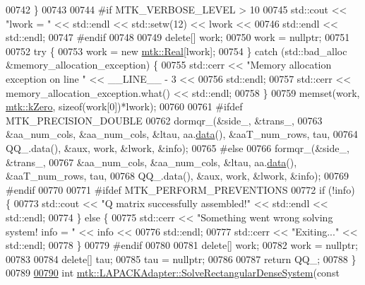 \begin{DoxyCode}
00742   \}
00743 
00744 \textcolor{preprocessor}{  #if MTK\_VERBOSE\_LEVEL > 10}
00745   std::cout << \textcolor{stringliteral}{"lwork = "} << std::endl << std::setw(12) << lwork <<
00746     std::endl << std::endl;
00747 \textcolor{preprocessor}{  #endif}
00748 
00749   \textcolor{keyword}{delete}[] work;
00750   work = \textcolor{keyword}{nullptr};
00751 
00752   \textcolor{keywordflow}{try} \{
00753     work = \textcolor{keyword}{new} \hyperlink{group__c01-roots_gac080bbbf5cbb5502c9f00405f894857d}{mtk::Real}[lwork];
00754   \} \textcolor{keywordflow}{catch} (std::bad\_alloc &memory\_allocation\_exception) \{
00755     std::cerr << \textcolor{stringliteral}{"Memory allocation exception on line "} << \_\_LINE\_\_ - 3 <<
00756       std::endl;
00757     std::cerr << memory\_allocation\_exception.what() << std::endl;
00758   \}
00759   memset(work, \hyperlink{group__c01-roots_ga59a451a5fae30d59649bcda274fea271}{mtk::kZero}, \textcolor{keyword}{sizeof}(work[0])*lwork);
00760 
00761 \textcolor{preprocessor}{  #ifdef MTK\_PRECISION\_DOUBLE}
00762   dormqr\_(&side\_, &trans\_,
00763           &aa\_num\_cols, &aa\_num\_cols, &ltau, aa.\hyperlink{classmtk_1_1DenseMatrix_a0c33b8a9e01d157c61ddbdf807c25d84}{data}(), &aaT\_num\_rows, tau,
00764           QQ\_.data(), &aux, work, &lwork, &info);
00765 \textcolor{preprocessor}{  #else}
00766   formqr\_(&side\_, &trans\_,
00767           &aa\_num\_cols, &aa\_num\_cols, &ltau, aa.\hyperlink{classmtk_1_1DenseMatrix_a0c33b8a9e01d157c61ddbdf807c25d84}{data}(), &aaT\_num\_rows, tau,
00768           QQ\_.data(), &aux, work, &lwork, &info);
00769 \textcolor{preprocessor}{  #endif}
00770 
00771 \textcolor{preprocessor}{  #ifdef MTK\_PERFORM\_PREVENTIONS}
00772   \textcolor{keywordflow}{if} (!info) \{
00773     std::cout << \textcolor{stringliteral}{"Q matrix successfully assembled!"} << std::endl << std::endl;
00774   \} \textcolor{keywordflow}{else} \{
00775     std::cerr << \textcolor{stringliteral}{"Something went wrong solving system! info = "} << info <<
00776       std::endl;
00777     std::cerr << \textcolor{stringliteral}{"Exiting..."} << std::endl;
00778   \}
00779 \textcolor{preprocessor}{  #endif}
00780 
00781   \textcolor{keyword}{delete}[] work;
00782   work = \textcolor{keyword}{nullptr};
00783 
00784   \textcolor{keyword}{delete}[] tau;
00785   tau = \textcolor{keyword}{nullptr};
00786 
00787   \textcolor{keywordflow}{return} QQ\_;
00788 \}
00789 
\hypertarget{mtk__lapack__adapter_8cc_source_l00790}{}\hyperlink{classmtk_1_1LAPACKAdapter_a380f148ffdf96bae2f79ae28f1a6560c}{00790} \textcolor{keywordtype}{int} \hyperlink{classmtk_1_1LAPACKAdapter_a380f148ffdf96bae2f79ae28f1a6560c}{mtk::LAPACKAdapter::SolveRectangularDenseSystem}(\textcolor{keyword}{const} 

\end{DoxyCode}
